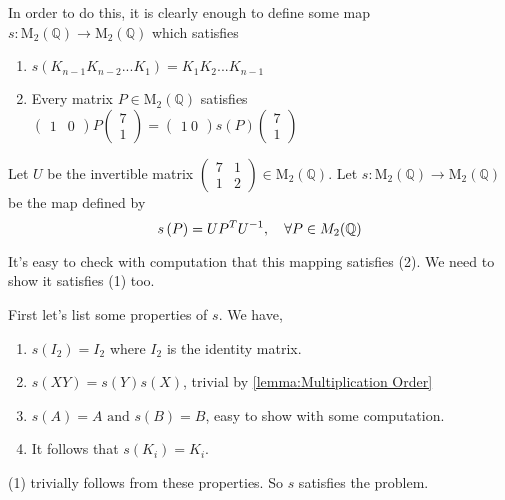 \begin{solution}
		In order to do this, it is clearly enough to define some map $s : \mathrm{M}_2\left(\mathbb Q\right) \to \mathrm{M}_2\left(\mathbb Q\right)$ which satisfies 
		\vspace{-1em}
		\begin{enumerate}
			\itemsep-.5em
			\item $ s\left(K_{n-1}K_{n-2}...K_1\right) = K_1K_2...K_{n-1} $
			\item Every matrix $P\in \mathrm{M}_2\left(\mathbb Q\right)$ satisfies $\left(\begin{array}{cc} 1&0 \end{array}\right) P\left(\begin{array}{c} 7\\ 1\end{array}\right) = \left(\begin{array}{cc} 1\ 0 \end{array}\right) s\left(P\right)\left(\begin{array}{c} 7\\ 1\end{array}\right)$
		\end{enumerate}
		
		Let $U$ be the invertible matrix $\left(\begin{array}{cc} 7&1\\ 1&2\end{array}\right) \in \mathrm{M}_2\left(\mathbb Q\right)$. Let $s : \mathrm{M}_2\left(\mathbb Q\right) \to \mathrm{M}_2\left(\mathbb Q\right)$ be the map defined by \[s\left(P\right) = UP^TU^{-1},\quad \forall P\in M_2(\mathbb{Q})\]
		
		It's easy to check with computation that this mapping satisfies (2). We need to show it satisfies (1) too.
		
		First let's list some properties of $ s $. We have,
		\begin{enumerate}
			\itemsep0em
			\item $ s(I_2)=I_2 $ where $ I_2 $ is the identity matrix.
			\item $ s(XY) = s(Y)s(X) $, trivial by \autoref{lemma:Multiplication Order}
			\item $ s(A)=A \text{ and } s(B)=B $, easy to show with some computation.
			\item It follows that $ s(K_i)=K_i $.
		\end{enumerate}
		(1) trivially follows from these properties. So $ s $ satisfies the problem.
	\end{solution}
	
